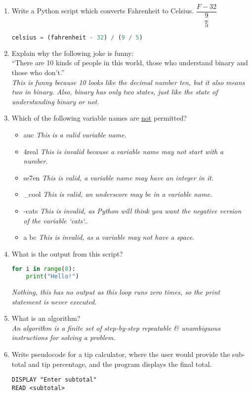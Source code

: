 \documentclass[letter,10pt]{article}
\newcommand*\tick{\item[\Checkmark]}
\newcommand*\fail{\item[\XSolidBrush]}
\begin{document}
\begin{enumerate}
    \item Write a Python script which converts Fahrenheit to Celsius. $\dfrac{F - 32}{\dfrac{9}{5}}$
    \begin{lstlisting}[language=python]
celsius = (fahrenheit - 32) / (9 / 5)
    \end{lstlisting}
    
    \item Explain why the following joke is funny: \\
    ``There are 10 kinds of people in this world, those who understand binary and those who don't.'' \\
    \textit{This is funny because 10 looks like the decimal number ten, but it also means two in binary. Also, binary has only two states, just like the state of understanding binary or not.}
    
    \item Which of the following variable names are \underline{not} permitted?
    \begin{itemize}
        \fail auc \textit{This is a valid variable name.}
        \tick 4real \textit{This is invalid because a variable name may not start with a number.}
        \fail se7en \textit{This is valid, a variable name may have an integer in it.}
        \fail \_cool \textit{This is valid, an underscore may be in a variable name.}
        \tick -cats \textit{This is invalid, as Python will think you want the negative version of the variable `cats`.}.
        \tick a bc \textit{This is invalid, as a variable may not have a space.}
    \end{itemize}

    \item What is the output from this script?
    \begin{lstlisting}[language=python]
for i in range(0):
    print("Hello!")
    \end{lstlisting}
    \textit{Nothing, this has no output as this loop runs zero times, so the print statement is never executed.}
    
    \item What is an algorithm? \\
    \textit{An algorithm is a finite set of step-by-step repeatable \& unambiguous instructions for solving a problem.}
    
    \item Write pseudocode for a tip calculator, where the user would provide the sub-total and tip percentage, and the program displays the final total.
    \begin{verbatim}
DISPLAY "Enter subtotal"
READ <subtotal>


\end{verbatim}
\end{enumerate}
\end{document}
